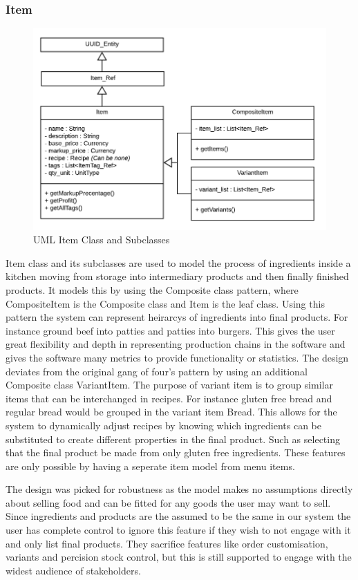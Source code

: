 \subsubsection{Item}
	\begin{figure}
		\centering
		\includegraphics[width=.6\linewidth]{images/data_model/item.png}
		\caption{UML Item Class and Subclasses}
	\end{figure}

	Item class and its subclasses are used to model the process of ingredients inside a kitchen moving from storage into intermediary products and then finally finished products. It models this by using the Composite class pattern, where CompositeItem is the Composite class and Item is the leaf class. Using this pattern the system can represent heirarcys of ingredients into final products. For instance ground beef into patties and patties into burgers. This gives the user great flexibility and depth in representing production chains in the software and gives the software many metrics to provide functionality or statistics. The design deviates from the original gang of four's pattern by using an additional Composite class VariantItem. The purpose of variant item is to group similar items that can be interchanged in recipes. For instance gluten free bread and regular bread would be grouped in the variant item Bread. This allows for the system to dynamically adjust recipes by knowing which ingredients can be substituted to create different properties in the final product. Such as selecting that the final product be made from only gluten free ingredients. These features are only possible by having a seperate item model from menu items.
	
	The design was picked for robustness as the model makes no assumptions directly about selling food and can be fitted for any goods the user may want to sell. Since ingredients and products are the assumed to be the same in our system the user has complete control to ignore this feature if they wish to not engage with it and only list final products. They sacrifice features like order customisation, variants and percision stock control, but this is still supported to engage with the widest audience of stakeholders.
	
